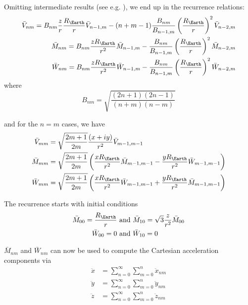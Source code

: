 Omitting intermediate results (see e.g. \cite{Atallah2022}), we end up in the 
recurrence relations:
\begin{equation}
  \begin{aligned}
    \bar{V}_{nm} = B_{nm} \frac{z}{r} \frac{R_{\Earth}}{r} \bar{V}_{n-1,m} 
      - (n+m-1) \frac{B_{nm}}{B_{n-1,m}} \left( \frac{R_{\Earth}}{r} \right) ^2 \bar{V}_{n-2,m} \\
    \bar{M}_{nm} = B_{nm} \frac{zR_{\Earth}}{r^2} \bar{M}_{n-1,m} 
      - \frac{B_{nm}}{B_{n-1,m}} \left( \frac{R_{\Earth}}{r} \right) ^2 \bar{M}_{n-2,m} \\
    \bar{W}_{nm} = B_{nm} \frac{zR_{\Earth}}{r^2} \bar{W}_{n-1,m} 
      - \frac{B_{nm}}{B_{n-1,m}} \left( \frac{R_{\Earth}}{r} \right) ^2 \bar{W}_{n-2,m}
  \end{aligned}
\end{equation}
where 
\begin{equation}
  B_{nm} = \sqrt{\frac{(2n+1)(2n-1)}{(n+m)(n-m)}}
\end{equation}

and for the $n=m$ cases, we have
\begin{equation}
  \begin{aligned}
    \bar{V}_{mm} &= \sqrt{\frac{2m+1}{2m}} \frac{\left(x+iy\right)}{r^2} \bar{V}_{m-1,m-1} \\
    \bar{M}_{mm} &= \sqrt{\frac{2m+1}{2m}} \left( \frac{xR_{\Earth}}{r^2} \bar{M}_{m-1,m-1} 
      - \frac{yR_{\Earth}}{r^2} \bar{W}_{m-1,m-1} \right) \\
    \bar{W}_{mm} &= \sqrt{\frac{2m+1}{2m}} \left( \frac{xR_{\Earth}}{r^2} \bar{W}_{m-1,m-1} 
      + \frac{yR_{\Earth}}{r^2} \bar{M}_{m-1,m-1} \right) \\
  \end{aligned}
\end{equation}

The recurrence starts with initial conditions
\begin{equation}
  \begin{aligned}
    \bar{M}_{00} = \frac{R_{\Earth}}{r} &\text{ and } 
      \bar{M}_{10} = \sqrt{3} \frac{z}{r^2} \bar{M}_{00} \\
    \bar{W}_{00} = 0 &\text{ and } \bar{W}_{10} = 0
  \end{aligned}
\end{equation}

$\bar{M}_{nm}$ and $\bar{W}_{nm}$ can now be used to compute the Cartesian acceleration 
components via
\begin{equation}
  \begin{aligned}
    \ddot{x} & = \sum_{n=0}^{\infty} \sum_{m=0}^{n} \ddot{x}_{nm} \\
    \ddot{y} & = \sum_{n=0}^{\infty} \sum_{m=0}^{n} \ddot{y}_{nm} \\
    \ddot{z} & = \sum_{n=0}^{\infty} \sum_{m=0}^{n} \ddot{z}_{nm}
  \end{aligned}
\end{equation}

